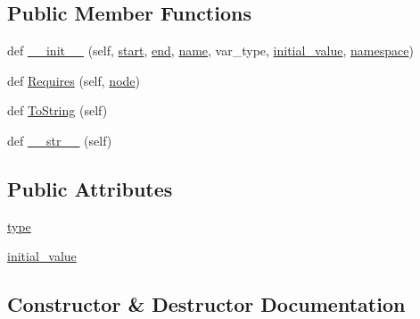 \subsection*{Public Member Functions}
\begin{DoxyCompactItemize}
\item 
def \hyperlink{classcpp_1_1ast_1_1VariableDeclaration_adc19909b6a3b2c2978b02044634fc13f}{\+\_\+\+\_\+init\+\_\+\+\_\+} (self, \hyperlink{classcpp_1_1ast_1_1Node_a7b2aa97e6a049bb1a93aea48c48f1f44}{start}, \hyperlink{classcpp_1_1ast_1_1Node_a3c5e5246ccf619df28eca02e29d69647}{end}, \hyperlink{classcpp_1_1ast_1_1__GenericDeclaration_af774f4729dfd78d0538a6782fe8514c1}{name}, var\+\_\+type, \hyperlink{classcpp_1_1ast_1_1VariableDeclaration_a7c259ca42a06e264679e8ab66e7ea374}{initial\+\_\+value}, \hyperlink{classcpp_1_1ast_1_1__GenericDeclaration_a8aee3f11b37449d54b42a78e0a689f46}{namespace})
\item 
def \hyperlink{classcpp_1_1ast_1_1VariableDeclaration_aaa1cae7cf191e6d561d861cd053a0bf4}{Requires} (self, \hyperlink{classnode}{node})
\item 
def \hyperlink{classcpp_1_1ast_1_1VariableDeclaration_a047aa4afddf7b7823a4095cea9477a21}{To\+String} (self)
\item 
def \hyperlink{classcpp_1_1ast_1_1VariableDeclaration_a9f5c15731d1bdd8fe14c2a575e2f4fe6}{\+\_\+\+\_\+str\+\_\+\+\_\+} (self)
\end{DoxyCompactItemize}
\subsection*{Public Attributes}
\begin{DoxyCompactItemize}
\item 
\hyperlink{classcpp_1_1ast_1_1VariableDeclaration_a8c7cc8578ea12f93c6e1c5c6ef4ddf99}{type}
\item 
\hyperlink{classcpp_1_1ast_1_1VariableDeclaration_a7c259ca42a06e264679e8ab66e7ea374}{initial\+\_\+value}
\end{DoxyCompactItemize}


\subsection{Constructor \& Destructor Documentation}
